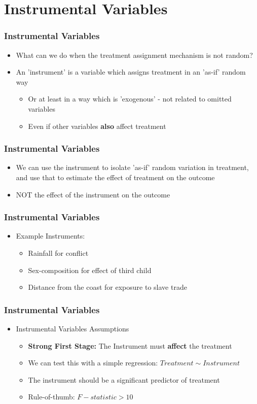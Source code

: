 \documentclass[xcolor=x11names,compress]{beamer}\usepackage[]{graphicx}\usepackage[]{color}
\renewcommand{\(}{\begin{columns}}
\renewcommand{\)}{\end{columns}}
\newcommand{\<}[1]{\begin{column}{#1}}
\renewcommand{\>}{\end{column}}
\begin{document}
\section{Instrumental Variables}

\begin{frame}
\frametitle{Instrumental Variables}
\begin{itemize}
\item What can we do when the treatment assignment mechanism is not random?
\pause
\item An 'instrument' is a variable which assigns treatment in an 'as-if' random way
\pause
\begin{itemize}
\item Or at least in a way which is 'exogenous' - not related to omitted variables
\item Even if other variables \textbf{also} affect treatment
\end{itemize}
\end{itemize}
\end{frame}

\begin{frame}
\frametitle{Instrumental Variables}
\begin{itemize}
\item We can use the instrument to isolate 'as-if' random variation in treatment, and use that to estimate the effect of treatment on the outcome
\pause
\item NOT the effect of the instrument on the outcome
\end{itemize}
\end{frame}

\begin{frame}
\frametitle{Instrumental Variables}
\begin{itemize}
\item Example Instruments:
\begin{itemize}
\item Rainfall for conflict 
\item Sex-composition for effect of third child
\item Distance from the coast for exposure to slave trade
\end{itemize}
\end{itemize}
\end{frame}

\begin{frame}
\frametitle{Instrumental Variables}
\begin{itemize}
\item Instrumental Variables Assumptions
\begin{itemize}
\item \textbf{Strong First Stage:} The Instrument must \textbf{affect} the treatment
\pause
\item We can test this with a simple regression: $Treatment \sim Instrument$
\pause
\item The instrument should be a significant predictor of treatment
\item Rule-of-thumb: $F-statistic > 10$
\end{itemize}
\end{itemize}
\end{frame}
\end{document}
